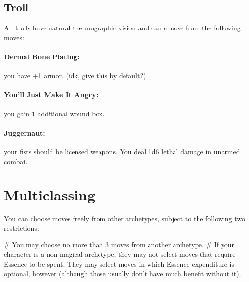 \subsection{Troll}
All trolls have natural thermographic vision and can choose from the following moves:

\paragraph{Dermal Bone Plating:} you have +1 armor. (idk, give this by default?)
\paragraph{You’ll Just Make It Angry:} you gain 1 additional wound box.
\paragraph{Juggernaut:} your fists should be licensed weapons. You deal 1d6 lethal damage in unarmed combat.


\section{Multiclassing}

You can choose moves freely from other archetypes, subject to the following two restrictions:

\begin{easylist}
    # You may choose no more than 3 moves from another archetype.
    # If your character is a non-magical archetype, they may not select moves that require Essence to be spent. They may select moves in which Essence expenditure is optional, however (although those usually don’t have much benefit without it).
\end{easylist}
